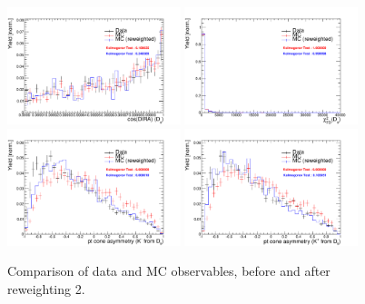 \begin{figure}[h!]
\includegraphics[height=6.cm,width=0.45\textwidth]{figs/MC-v-Data/Ds_DIRA_OWNPV.pdf}
\includegraphics[height=6.cm,width=0.45\textwidth]{figs/MC-v-Data/Ds_FDCHI2_ORIVX.pdf}\\
\includegraphics[height=6.cm,width=0.45\textwidth]{figs/MC-v-Data/K_minus_fromDs_ptasy_1_00.pdf}
\includegraphics[height=6.cm,width=0.45\textwidth]{figs/MC-v-Data/K_plus_fromDs_ptasy_1_00.pdf}
\caption{Comparison of data and MC observables, before and after reweighting 2.}
\end{figure}

